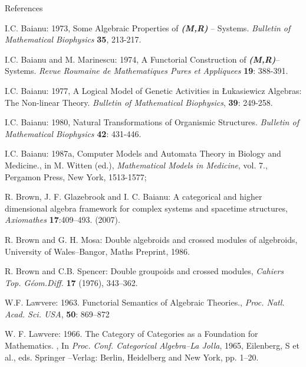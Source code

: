 \documentclass[12pt]{article}
\theoremstyle{plain}
\theoremstyle{definition}
\numberwithin{equation}{section}
\begin{document}
\begin{thebibliography}{99}

References 

I.C. Baianu: 1973, Some Algebraic Properties of \emph{\textbf{(M,R)}} -- Systems. \emph{Bulletin of Mathematical Biophysics} \textbf{35}, 213-217.

I.C. Baianu and M. Marinescu: 1974, A Functorial Construction of \emph{\textbf{(M,R)}}-- Systems. \emph{Revue Roumaine de Mathematiques Pures et Appliquees} \textbf{19}: 388-391.

I.C. Baianu: 1977, A Logical Model of Genetic Activities in \L ukasiewicz Algebras: The Non-linear Theory. \emph{Bulletin of Mathematical Biophysics}, \textbf{39}: 249-258.

I.C. Baianu: 1980, Natural Transformations of Organismic Structures. \emph{Bulletin of Mathematical Biophysics}
\textbf{42}: 431-446.

I.C. Baianu: 1987a, Computer Models and Automata Theory in Biology and Medicine.,  in M. Witten (ed.), 
\emph{Mathematical Models in Medicine}, vol. 7., Pergamon Press, New York, 1513-1577;  

R. Brown, J. F. Glazebrook and I. C. Baianu: A categorical and higher dimensional algebra framework for complex systems and spacetime structures, \emph{Axiomathes} \textbf{17}:409--493.
(2007).

R. Brown and G. H. Mosa: Double algebroids and crossed modules of algebroids, University of Wales--Bangor, Maths Preprint, 1986.

R. Brown  and C.B. Spencer: Double groupoids and crossed modules,
\emph{Cahiers Top. G\'eom.Diff.} \textbf{17} (1976), 343--362.

W.F. Lawvere: 1963. Functorial Semantics of Algebraic Theories.,
 {\em Proc. Natl. Acad. Sci. USA}, {\bf 50}: 869--872

W. F. Lawvere: 1966. The Category of Categories as a Foundation for Mathematics. , 
In {\em Proc. Conf. Categorical Algebra--La Jolla}, 1965, Eilenberg, S et al., eds. Springer --Verlag: Berlin, Heidelberg and New York, pp. 1--20.


\end{thebibliography}

\end{document}
